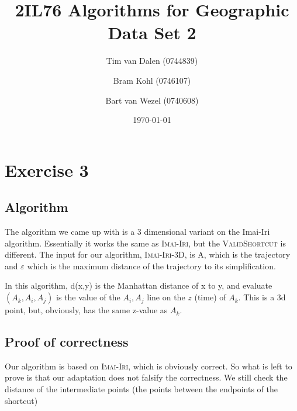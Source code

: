 \documentclass[a4paper,11pt]{article}
\title{
	2IL76 Algorithms for Geographic Data Set 2 \\
}
\author{
	Tim van Dalen (0744839)
	\and
	Bram Kohl (0746107)
	\and
	Bart van Wezel (0740608)
}
\date{\today}
\begin{document}
	\maketitle
	
\section*{Exercise 3}
\subsection*{Algorithm}
The algorithm we came up with is a 3 dimensional variant on the Imai-Iri algorithm. Essentially it works the same as \textsc{Imai-Iri}, but the \textsc{ValidShortcut} is different. The input for our algorithm, \textsc{Imai-Iri-3D}, is A, which is the trajectory and $\varepsilon$ which is the maximum distance of the trajectory to its simplification.



In this algorithm, d(x,y) is the Manhattan distance of x to y, and evaluate$(A_k,A_i,A_j)$ is the value of the $A_i,A_j$ line on the $z$ (time) of $A_k$. This is a 3d point, but, obviously, has the same z-value as $A_k$.

\subsection*{Proof of correctness}
Our algorithm is based on \textsc{Imai-Iri}, which is obviously correct. So what is left to prove is that our adaptation does not falsify the correctness. We still check the distance of the intermediate points (the points between the endpoints of the shortcut)
\end{document}
